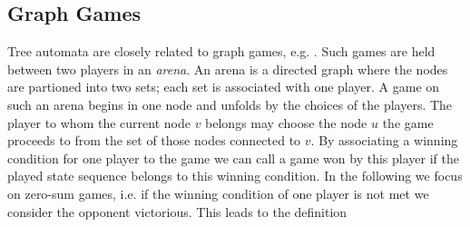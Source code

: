 \subsection{Graph Games}
Tree automata are closely related to graph games, e.g.
\cite[Chapter 9]{AutoLogInfGames}. Such games are held between two players in
an \emph{arena}. An arena is a directed graph where the nodes are partioned
into two sets; each set is associated with one player. A game on such an arena
begins in one node and unfolds by the choices of the players. The player to
whom the current node $v$ belongs may choose the node $u$ the game proceeds to
from the set of those nodes connected to $v$. By associating a winning
condition for one player to the game we can call a game won by this player if
the played state sequence belongs to this winning condition. In the following 
we focus on zero-sum games, i.e. if the winning condition of one player is not 
met we consider the opponent victorious. This leads to the definition
